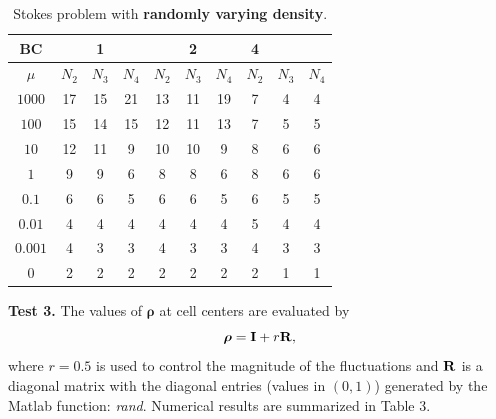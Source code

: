 \documentclass[9pt]{article}
\newcommand{\V}[1]{\boldsymbol{#1}}
\begin{document}
\begin{table}[h]
\begin{center}
\begin{tabular}{|c||ccc|ccc|ccc|}
\hline
 BC         &    &1    &   &    &2    &   &4     &      &\\
\hline
$\mu $     &$N_2$ &$N_3$  &$N_4$  &$N_2$ &$N_3$  &$N_4$   &$N_2$  &$N_3$  &$N_4$ \\
\hline
\hline
$1000$    &17    &15    &21     &13  &11  &19     &7   &4  &4 \\
\hline
$100$     &15    &14    &15     &12  &11  &13     &7   &5  &5 \\
\hline
$10$      &12    &11    &9      &10  &10  &9      &8   &6  &6 \\
\hline
$1$        &9    &9     &6      &8   &8   &6      &8   &6  &6 \\
\hline
$0.1$     &6   &6    &5        &6   &6   &5       &6   &5  &5 \\
\hline
$0.01$    &4   &4    &4        &4   &4   &4       &5   &4  &4 \\
\hline
$0.001$   &4   &3    &3        &4   &3   &3       &4   &3  &3 \\
\hline
$0$       &2    &2   &2        &2   &2   &2       &2   &1  &1 \\
\hline
\end{tabular}
\vspace{2mm} \caption{Stokes problem with {\bf randomly varying density}.
}
\end{center}
\end{table}

{\bf Test 3.} The values of $\V{\rho}$ at cell centers are evaluated by
$$
\V{\rho} = {\bf I}+ r {\bf R},
$$
where $r=0.5$ is used to control the magnitude of the fluctuations and ${\bf R}$ is a diagonal matrix with the diagonal entries (values in $(0, 1)$) generated by the Matlab function: {\it rand}. Numerical results are summarized in Table 3.
\end{document}
